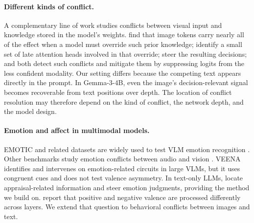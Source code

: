 \documentclass{article}
\newcommand{\gemma}{Gemma-3-4B}
\begin{document}
\paragraph{Different kinds of conflict.}
A complementary line of work studies conflicts between visual input and knowledge stored in the model's weights. \citet{nooralahzadeh2026} find that image tokens carry nearly all of the effect when a model must override such prior knowledge; \citet{lietzow2026} identify a small set of late attention heads involved in that override; \citet{seeingoverrides2026} steer the resulting decisions; and \citet{unraveling2024} both detect such conflicts and mitigate them by suppressing logits from the less confident modality. Our setting differs because the competing text appears directly in the prompt. In \gemma{}, even the image's decision-relevant signal becomes recoverable from text positions over depth. The location of conflict resolution may therefore depend on the kind of conflict, the network depth, and the model design.

\paragraph{Emotion and affect in multimodal models.}
EMOTIC and related datasets are widely used to test VLM emotion recognition \citep{kosti2019, etesam2024, agarwal2026}. Other benchmarks study emotion conflicts between audio and vision \citep{mosear2025, emomm2026}. VEENA \citep{veena2026} identifies and intervenes on emotion-related circuits in large VLMs, but it uses congruent cues and does not test valence asymmetry. In text-only LLMs, \citet{tak2025} locate appraisal-related information and steer emotion judgments, providing the method we build on. \citet{negbeforepos2026} report that positive and negative valence are processed differently across layers. We extend that question to behavioral conflicts between images and text.
\end{document}
